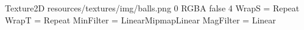 Texture2D
resources/textures/img/balls.png
0
RGBA
false
4
WrapS = Repeat
WrapT = Repeat
MinFilter = LinearMipmapLinear
MagFilter = Linear
